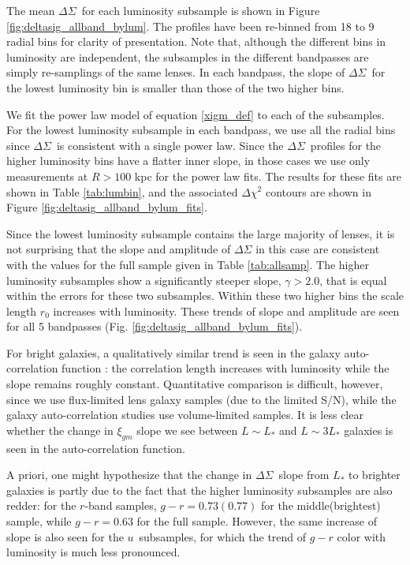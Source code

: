 \documentclass{emulateapj}
\newcommand{\umag}{$u$}
\newcommand{\rmag}{$r$}
\newcommand{\deltasig}{$\Delta \Sigma$}
\begin{document}
The mean \deltasig\ for each luminosity subsample is shown in Figure
\ref{fig:deltasig_allband_bylum}. The profiles
have been re-binned from 18 to 9 radial bins for clarity of presentation.
Note that, although the
different bins in luminosity are independent, the subsamples in the different
bandpasses are simply re-samplings of the same lenses.
In each bandpass, the slope of \deltasig\ for the lowest luminosity bin 
is smaller than those of the two
higher bins. 

We fit the power law model of equation \ref{xigm_def} to each of the
subsamples.  For the lowest luminosity subsample in each bandpass, 
we use all the radial bins since \deltasig\ is consistent with a 
single power law. Since 
the \deltasig\ profiles for the higher luminosity bins have a 
flatter inner slope, in those cases we use
only measurements at $R > 100$ kpc for the power law fits.  The results for these
fits are shown in Table \ref{tab:lumbin}, and the associated 
$\Delta \chi^2$ contours are shown in Figure \ref{fig:deltasig_allband_bylum_fits}.

Since the lowest luminosity subsample contains the large majority of lenses, 
it is not surprising that the slope and amplitude of $\Delta \Sigma$ 
in this case are consistent with the values for the full sample given in 
Table \ref{tab:allsamp}.  The higher
luminosity subsamples show a significantly steeper slope, $\gamma > 2.0$, 
that is equal within the errors for these two subsamples. 
Within these two higher bins the scale length $r_0$ increases with
luminosity.  These trends of slope and amplitude are seen for all 5
bandpasses (Fig. \ref{fig:deltasig_allband_bylum_fits}). 

For bright 
galaxies, a qualitatively similar trend is seen 
in the galaxy auto-correlation function \citep{Norberg01,Zehavi02}: the 
correlation length increases with luminosity while the slope remains 
roughly constant. Quantitative comparison is difficult, however, 
since we use flux-limited lens galaxy samples (due to the 
limited S/N), while the galaxy auto-correlation studies use volume-limited samples. 
It is less clear whether the change in $\xi_{gm}$ slope we see 
between $L \sim L_*$ and $L \sim 3L_*$ galaxies is seen in the 
auto-correlation function. 

A priori, one might hypothesize 
that the change in \deltasig\ slope from $L_*$ to brighter galaxies 
is partly due to the fact that the 
higher luminosity subsamples are also redder: for the \rmag-band 
samples, $g-r = 0.73(0.77)$ 
for the middle(brightest) sample, while $g-r = 0.63$ for the full sample. 
However, the same increase of slope is also seen for the \umag\ subsamples, 
for which the trend of $g-r$ color with luminosity is much less pronounced.
\end{document}
